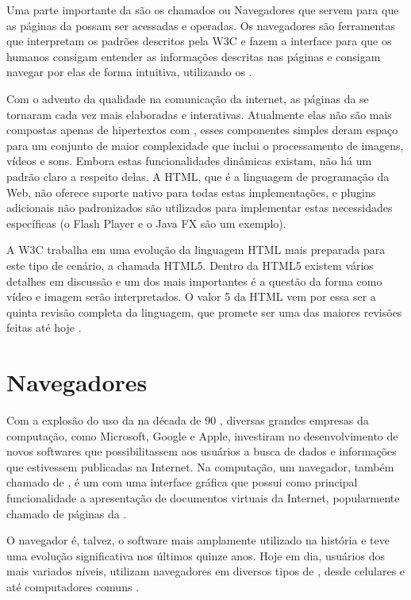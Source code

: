 \documentclass[espaco=simples,appendix=Name]{abnt}
\begin{document}
Uma parte importante da  são os chamados  ou Navegadores que servem para que as páginas da  possam ser acessadas e operadas. Os navegadores são ferramentas que interpretam os padrões descritos pela W3C e fazem a interface para que os humanos consigam entender as informações descritas nas páginas e consigam navegar por elas de forma intuitiva, utilizando os .

Com o advento da qualidade na comunicação da internet, as páginas da  se tornaram cada vez mais elaboradas e interativas. Atualmente elas não são mais compostas apenas de hipertextos com , esses componentes simples deram espaço para um conjunto de maior complexidade que inclui o processamento de imagens, vídeos e sons. Embora estas funcionalidades dinâmicas existam, não há um padrão claro a respeito delas. A HTML, que é a linguagem de programação da Web, não oferece suporte nativo para todas estas implementações, e plugins adicionais não padronizados são utilizados para implementar estas necessidades específicas (o Flash Player e o Java FX são um exemplo).

A W3C trabalha em uma evolução da linguagem HTML mais preparada para este tipo de cenário, a chamada HTML5. Dentro da HTML5 existem vários detalhes em discussão e um dos mais importantes é a questão da forma como vídeo e imagem serão interpretados. O valor 5 da HTML vem por essa ser a quinta revisão completa da linguagem, que promete ser uma das maiores revisões feitas até hoje \cite{HTML5spec}.


\section{Navegadores}

Com a explosão do uso da  na década de 90 \cite{BloombergGameChangers}, diversas grandes empresas da computação, como Microsoft, Google e Apple, investiram no desenvolvimento de novos softwares que possibilitassem aos usuários a busca de dados e informações que estivessem publicadas na Internet. Na computação, um navegador, também chamado de , é um  com uma interface gráfica que possui como principal funcionalidade a apresentação de documentos virtuais da Internet, popularmente chamado de páginas da .

O navegador é, talvez, o software mais amplamente utilizado na história e teve uma evolução significativa nos últimos quinze anos. Hoje em dia, usuários dos mais variados níveis, utilizam navegadores em diversos tipos de , desde celulares e  até computadores comuns \cite{ArchitectureWebBrowsers}.
\end{document}
